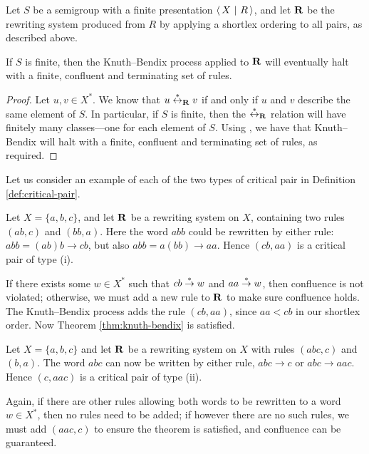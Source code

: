 \begin{theorem}
  Let $S$ be a semigroup with a finite presentation $\left\langle\,X ~\middle|~ R\,\right\rangle$, and let $\mathbf{R}$
  be the rewriting system produced from $R$ by applying a shortlex ordering to
  all pairs, as described above.

  If $S$ is finite, then the Knuth--Bendix process applied to $\mathbf{R}$ will
  eventually halt with a finite, confluent and terminating set of rules.

  \begin{proof}
    Let $u,v \in X^*$.  We know that $u \stackrel{*}{\leftrightarrow}_{\mathbf{R}} v$ if and only if $u$ and
    $v$ describe the same element of $S$.  In particular, if $S$ is finite, then
    the $\stackrel{*}{\leftrightarrow}_{\mathbf{R}}$ relation will have finitely many classes---one for each
    element of $S$.  Using \cite[Corollary 12.21]{cgt}, we have that
    Knuth--Bendix will halt with a finite, confluent and terminating set of
    rules, as required.
  \end{proof}
\end{theorem}

Let us consider an example of each of the two types of critical pair in
Definition \ref{def:critical-pair}.

\begin{example}
  Let $X=\{a,b,c\}$, and let $\mathbf{R}$ be a rewriting system on $X$, containing
  two rules $(ab, c)$ and $(bb, a)$.  Here the word $abb$ could be
  rewritten by either rule: $abb = (ab)b \to cb$, but also
  $abb = a(bb) \to aa$.  Hence $(cb, aa)$ is a critical pair of type (i).

  If there exists some $w \in X^*$ such that $cb \stackrel{*}{\to} w$ and $aa \stackrel{*}{\to} w$,
  then confluence is not violated; otherwise, we must add a new rule to $\mathbf{R}$
  to make sure confluence holds.  The Knuth--Bendix process adds the rule
  $(cb, aa)$, since $aa < cb$ in our shortlex order.  Now Theorem
  \ref{thm:knuth-bendix} is satisfied.
\end{example}

\begin{example}
  Let $X=\{a,b,c\}$ and let $\mathbf{R}$ be a rewriting system on $X$ with rules
  $(abc, c)$ and $(b, a)$.  The word $abc$ can now be written by either rule,
  $abc \to c$ or $abc \to aac$.  Hence $(c, aac)$ is a critical pair of type
  (ii).

  Again, if there are other rules allowing both words to be rewritten to a word
  $w \in X^*$, then no rules need to be added; if however there are no such
  rules, we must add $(aac, c)$ to ensure the theorem is satisfied, and
  confluence can be guaranteed.
\end{example}

